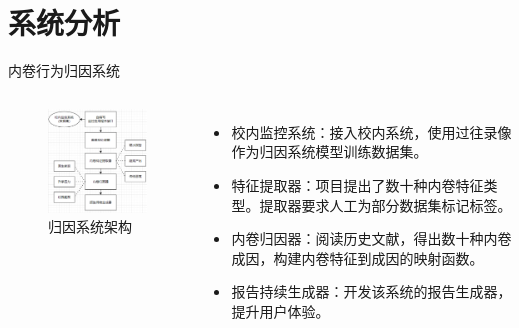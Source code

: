 %
%
%
%
\section{系统分析}
    \begin{frame}{内卷行为归因系统}
        \begin{columns}
            \begin{figure}
                \centering \includegraphics[width=2in]{contents/figure/factor-analyzer.png}
                \caption{归因系统架构}
                \label{fig:factor-analyzer}
            \end{figure}

            \begin{itemize}
                \item 校内监控系统：接入校内系统，使用过往录像作为归因系统模型训练数据集。
                \item 特征提取器：项目提出了数十种内卷特征类型。提取器要求人工为部分数据集标记标签。
                \item 内卷归因器：阅读历史文献，得出数十种内卷成因，构建内卷特征到成因的映射函数。
                \item 报告持续生成器：开发该系统的报告生成器，提升用户体验。
            \end{itemize}
        \end{columns}
    \end{frame}

